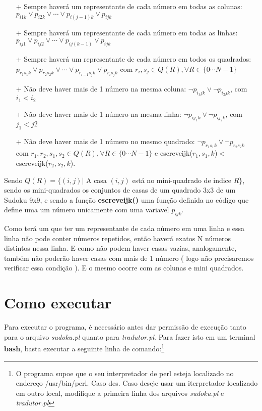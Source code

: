 \documentclass[11pt]{article}
\begin{document}
\begin{itemize}

 \item[+] Sempre haverá um representante de cada número em todas as colunas: $p_{i1k}\vee p_{i2k}\vee \cdots \vee p_{i(j-1)k}\vee p_{ijk}$
 \item[+] Sempre haverá um representante de cada número em todas as linhas:
 $p_{ij1}\vee p_{ij2}\vee \cdots \vee p_{ij(k-1)}\vee p_{ijk}$
 \item[+] Sempre haverá um representante de cada número em todos os quadrados:
 $p_{r_{1}s_{1}k}\vee p_{r_{2}s_{2}k}\vee \cdots \vee p_{r_{i-1}s_{j}k}\vee p_{r_{i}s_{j}k}$ com $r_{i}, s_{j} \in Q(R), \forall R \in \{0\cdots N-1\} $
 \item[+] Não deve haver mais de 1 número na mesma coluna:
 $\neg p_{i_{1}jk}\vee \neg p_{i_{2}jk}$, com $i_{1}<i_{2} $
 \item[+] Não deve haver mais de 1 número na mesma linha:
 $\neg p_{ij_{1}k}\vee \neg p_{ij_{2}k}  $, com $j_{1}<j{2} $
 \item[+] Não deve haver mais de 1 número no mesmo quadrado:
 $\neg p_{r_{1}s_{1}k}\vee \neg p_{r_{2}s_{2}k} $ com $r_{1},r_{2}, s_{1}, s_{2} \in Q(R), \forall R \in \{0\cdots N-1\}$ e escreveijk($r_{1},s_{1},k$)$<$ escreveijk($ r_{2},s_{2},k $).
 
 
\end{itemize}

Sendo $Q(R) = \{ (i,j) |$ A casa $(i,j)$ está no mini-quadrado de indice $R \}$, sendo os mini-quadrados os conjuntos de casas de um quadrado 3x3 de um Sudoku 9x9, e sendo a função \textbf{\color{red}escreveijk()} uma função definida no código que define uma um número unicamente com uma variavel $p_{ijk}$.



Como terá um que ter um representante de cada número em uma linha e essa
 linha não pode conter números repetidos, então haverá exatos N números
 distintos nessa linha. E como não podem haver casas vazias, analogamente,
 também não poderão haver casas com mais de 1 número ( logo não precisaremos
 verificar essa condição ). E o mesmo ocorre com as colunas e mini quadrados.

\section{Como executar}

Para executar o programa, é necessário antes dar permissão de execução tanto para o arquivo \emph{sudoku.pl} quanto para \emph{tradutor.pl}. Para fazer isto em um terminal \textbf{\color{red}bash}, basta executar a seguinte linha de comando:\footnote{O programa supoe que o seu interpretador de perl esteja localizado no endereço {\color{red}/usr/bin/perl}. Caso des. Caso deseje usar um iterpretador localizado em outro local, modifique a primeira linha dos arquivos \emph{sudoku.pl} e \emph{tradutor.pl}}
\end{document}
